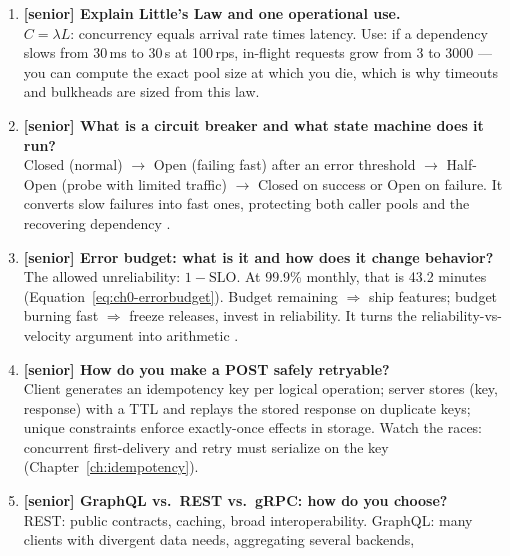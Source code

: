 \begin{enumerate}[label=\textbf{Q\arabic*.}, leftmargin=3.2em]
    (1)~Only retry on retryable failures: transport errors, 429, 5xx ---
    never 4xx semantics; (2)~only idempotent operations, or add
    idempotency keys; (3)~bounded attempts (typically 3); (4)~exponential
    backoff with full jitter; (5)~a retry budget so retries stay a small
    fraction of traffic; (6)~respect \texttt{Retry-After}; (7)~the total
    retry deadline must fit the caller's own latency budget.
  \item \textbf{[senior] Explain Little's Law and one operational use.}\\
    $C = \lambda L$: concurrency equals arrival rate times latency. Use:
    if a dependency slows from 30\,ms to 30\,s at 100\,rps, in-flight
    requests grow from 3 to 3000 --- you can compute the exact pool size
    at which you die, which is why timeouts and bulkheads are sized from
    this law.
  \item \textbf{[senior] What is a circuit breaker and what state machine
    does it run?}\\
    Closed (normal) $\to$ Open (failing fast) after an error threshold
    $\to$ Half-Open (probe with limited traffic) $\to$ Closed on success
    or Open on failure. It converts slow failures into fast ones,
    protecting both caller pools and the recovering dependency
    \cite{nygard2018releaseit}.
  \item \textbf{[senior] Error budget: what is it and how does it change
    behavior?}\\
    The allowed unreliability: $1 - \mathrm{SLO}$. At 99.9\% monthly, that
    is 43.2 minutes (Equation~\eqref{eq:ch0-errorbudget}). Budget
    remaining $\Rightarrow$ ship features; budget burning fast
    $\Rightarrow$ freeze releases, invest in reliability. It turns the
    reliability-vs-velocity argument into arithmetic \cite{beyer2016sre}.
  \item \textbf{[senior] How do you make a POST safely retryable?}\\
    Client generates an idempotency key per logical operation; server
    stores (key, response) with a TTL and replays the stored response on
    duplicate keys; unique constraints enforce exactly-once effects in
    storage. Watch the races: concurrent first-delivery and retry must
    serialize on the key (Chapter~\ref{ch:idempotency}).
  \item \textbf{[senior] GraphQL vs.\ REST vs.\ gRPC: how do you choose?}\\
    REST: public contracts, caching, broad interoperability. GraphQL:
    many clients with divergent data needs, aggregating several backends,

\end{enumerate}
